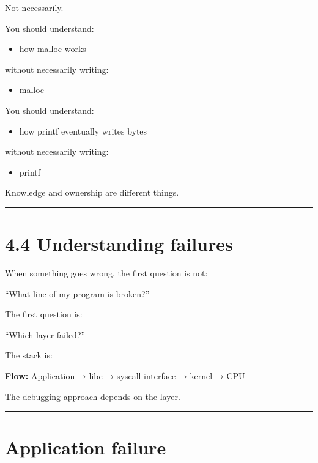\documentclass[
  oneside,
  openany]{book}
\providecommand{\tightlist}{%
  \setlength{\itemsep}{0pt}\setlength{\parskip}{0pt}}
\begin{document}
Not necessarily.

You should understand:

\begin{itemize}
\tightlist
\item
  how malloc works
\end{itemize}

without necessarily writing:

\begin{itemize}
\tightlist
\item
  malloc
\end{itemize}

You should understand:

\begin{itemize}
\tightlist
\item
  how printf eventually writes bytes
\end{itemize}

without necessarily writing:

\begin{itemize}
\tightlist
\item
  printf
\end{itemize}

Knowledge and ownership are different things.

\begin{center}\rule{0.5\linewidth}{0.5pt}\end{center}

\hypertarget{understanding-failures}{%
\section{4.4 Understanding failures}\label{understanding-failures}}

When something goes wrong, the first question is not:

``What line of my program is broken?''

The first question is:

``Which layer failed?''

The stack is:

\textbf{Flow:} Application → libc → syscall interface → kernel → CPU

The debugging approach depends on the layer.

\begin{center}\rule{0.5\linewidth}{0.5pt}\end{center}

\hypertarget{application-failure}{%
\section{Application failure}\label{application-failure}}
\end{document}
